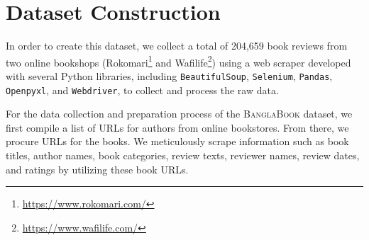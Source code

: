 \section{Dataset Construction}

In order to create this dataset, we collect a total of 204,659 book reviews from two online bookshops (Rokomari\footnote{\url{https://www.rokomari.com/}} and Wafilife\footnote{\url{https://www.wafilife.com/}}) using a web scraper developed with several Python libraries, including \verb|BeautifulSoup|, \verb|Selenium|, \verb|Pandas|, \verb|Openpyxl|, and \verb|Webdriver|, to collect and process the raw data.

For the data collection and preparation process of the \textsc{BanglaBook} dataset, we first compile a list of URLs for authors from online bookstores. From there, we procure URLs for the books. We meticulously scrape information such as book titles, author names, book categories, review texts, reviewer names, review dates, and ratings by utilizing these book URLs. 


